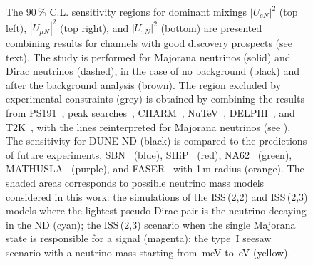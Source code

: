 \begin{figure}
	\centering
	\noindent{}

	\vspace{0.5em}
	{\resizebox{0.5\linewidth}{!}{}}
	\vspace{-0.2em}
	\caption[Combined sensitivity for dominant mixings for channels with good discovery prospects]%
		{The 90\,\% C.L. sensitivity regions for dominant mixings %
		$|U_{e N}|^2$ (top left), $|U_{\mu N}|^2$ (top right), and $|U_{\tau N}|^2$ (bottom) are presented %
		combining results for channels with good discovery prospects (see text).
		The study is performed for Majorana neutrinos (solid) and Dirac neutrinos (dashed), %
		in the case of no background (black) and after the background analysis (brown).
		The region excluded by experimental constraints (grey) is obtained by combining the results from
		PS191~\cite{Bernardi:1985ny, Bernardi:1987ek}, %
		peak searches~\cite{Artamonov:2014urb, Britton:1992pg, Britton:1992xv, Aguilar-Arevalo:2017vlf, Aguilar-Arevalo:2019owf}, %
		CHARM~\cite{Vilain:1994vg}, NuTeV~\cite{Vaitaitis:1999wq}, DELPHI~\cite{Abreu:1996pa}, and T2K~\cite{Abe:2019kgx}, %
		with the lines reinterpreted for Majorana neutrinos (see ).
		The sensitivity for DUNE ND (black) is compared to the predictions of future experiments, %
		SBN~\cite{Ballett:2016opr} (blue), %
		SHiP~\cite{Alekhin:2015byh} (red), NA62~\cite{Drewes:2018irr} (green), MATHUSLA~\cite{Curtin:2018mvb} (purple), %
		and FASER~\cite{Kling:2018wct} with 1\,m radius (orange).
		The shaded areas corresponds to possible neutrino mass models considered in this work: %
		the simulations of the ISS\,(2,2) and ISS\,(2,3) models where the lightest %
		pseudo-Dirac pair is the neutrino decaying in the ND (cyan); %
		the ISS\,(2,3) scenario when the single Majorana state is responsible for a signal (magenta); %
		the type~I seesaw scenario with a neutrino mass starting from \,meV to \,eV (yellow).}
	\label{fig:sensAll}
\end{figure}

